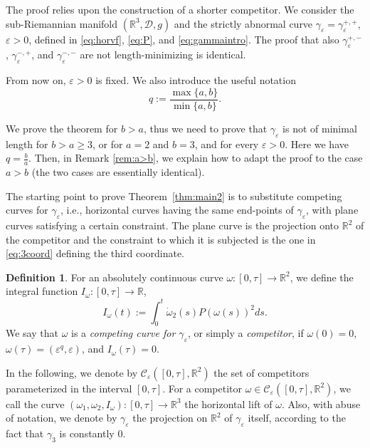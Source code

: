 \documentclass[12pt]{amsart}
\theoremstyle{plain}
\theoremstyle{definition}
\newtheorem{definition}[theorem]{Definition}
\theoremstyle{remark}
\numberwithin{equation}{section}
\newcommand{\R}{\mathbb{R}}
\newcommand{\D}{\mathcal{D}}
\newcommand{\<}{\langle}
\renewcommand{\>}{\rangle}
\newcommand{\e}{\varepsilon}
\newcommand{\0}{\theta}
\newcommand{\w}{\omega}
\newcommand{\g}{\gamma}
\newcommand{\1}{{-1}}
\renewcommand{\=}{\coloneqq}
\renewcommand{\.}{\dots}
\renewcommand{\-}{\cdot}
\renewcommand{\:}{\,:\,}
\newcommand{\mc}{\mathcal}
\theoremstyle{definition}
\begin{document}
\label{sec:pfthm2}

The proof relies upon the construction of a shorter competitor. We consider the sub-Riemannian manifold $(\R^3,\D,g)$ and the strictly abnormal curve $\g_\e=\g_\e^{+,+}$, $\e>0$, defined in \eqref{eq:horvf}, \eqref{eq:P}, and \eqref{eq:gammaintro}. The proof that also $\g_\e^{+,-}$, $\g_\e^{-,+}$, and $\g_\e^{-,-}$ are not length-minimizing is identical. 

From now on, $\e>0$ is fixed. We also introduce the useful notation
\begin{equation}
	q:=\frac{\max\{a,b\}}{\min\{a,b\}}.
\end{equation}

We prove the theorem for $b>a$, thus we need to prove that $\g_\e$ is not of minimal length for $b>a\geq3$, or for $a=2$ and $b=3$, and for every $\e>0$. Here we have $q=\frac ba$. Then, in Remark \ref{rem:a>b}, we explain how to adapt the proof to the case $a>b$ (the two cases are essentially identical). 





\medskip

The starting point to prove Theorem~\ref{thm:main2} is to substitute competing curves for $\g_\e$, i.e., horizontal curves having the same end-points of $\g_\e$, with plane curves satisfying a certain constraint. The plane curve is the projection onto $\R^2$ of the competitor and the constraint to which it is subjected is the one in \eqref{eq:3coord} defining the third coordinate. 



\begin{definition}
	\label{def:plane_comp}
	For an absolutely continuous curve $\w:[0,\tau]\to\R^2$, we define the integral function $I_\w:[0,\tau]\to\R$,
	\begin{equation}
		\label{eq:dotomega3}
		I_\w(t):=\int_{0}^{t} \dot\w_2(s)P(\w(s))^2ds.
	\end{equation}
	We say that $\w$ is a {\em competing curve for $\g_\e$}, or simply a {\em competitor}, if $\w(0)=0$, $\w(\tau)=(\e^q,\e)$, and $I_\w(\tau)=0$.	
\end{definition}

In the following, we denote by $\mc C_\e([0,\tau],\R^2)$ the set of competitors parameterized in the interval $[0,\tau]$. For a competitor $\w\in \mc C_\e([0,\tau],\R^2)$, we call the curve $(\w_1,\w_2,I_\w):[0,\tau]\to\R^3$ the horizontal lift of $\w$. Also, with abuse of notation, we denote by $\g_\e$ the projection on $\R^2$ of $\g_\e$ itself, according to the fact that $\g_3$ is constantly 0.
\end{document}
